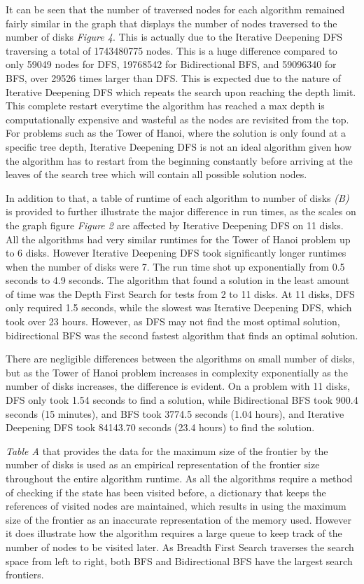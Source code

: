 \documentclass[conference]{IEEEtran}
\begin{document}
It can be seen that the number of traversed nodes for each algorithm remained fairly similar in the graph that displays the number of nodes traversed to the number of disks \textit{Figure 4}. This is actually due to the Iterative Deepening DFS traversing a total of 1743480775 nodes. This is a huge difference compared to only 59049 nodes for DFS, 19768542 for Bidirectional BFS, and 59096340 for BFS, over 29526 times larger than DFS. This is expected due to the nature of Iterative Deepening DFS which repeats the search upon reaching the depth limit. This complete restart everytime the algorithm has reached a max depth is computationally expensive and wasteful as the nodes are revisited from the top. For problems such as the Tower of Hanoi, where the solution is only found at a specific tree depth, Iterative Deepening DFS is not an ideal algorithm given how the algorithm has to restart from the beginning constantly before arriving at the leaves of the search tree which will contain all possible solution nodes. 

In addition to that, a table of runtime of each algorithm to number of disks \textit{(B)} is provided to further illustrate the major difference in run times, as the scales on the graph figure \textit{Figure 2} are affected by Iterative Deepening DFS on 11 disks. All the algorithms had very similar runtimes for the Tower of Hanoi problem up to 6 disks. However Iterative Deepening DFS took significantly longer runtimes when the number of disks were 7. The run time shot up exponentially from 0.5 seconds to 4.9 seconds. The algorithm that found a solution in the least amount of time was the Depth First Search for tests from 2 to 11 disks. At 11 disks, DFS only required 1.5 seconds, while the slowest was Iterative Deepening DFS, which took over 23 hours. However, as DFS may not find the most optimal solution, bidirectional BFS was the second fastest algorithm that finds an optimal solution.

There are negligible differences between the algorithms on small number of disks, but as the Tower of Hanoi problem increases in complexity exponentially as the number of disks increases, the difference is evident. On a problem with 11 disks, DFS only took 1.54 seconds to find a solution, while Bidirectional BFS took 900.4 seconds (15 minutes), and BFS took 3774.5 seconds (1.04 hours), and Iterative Deepening DFS took 84143.70 seconds (23.4 hours) to find the solution. 

\textit{Table A} that provides the data for the maximum size of the frontier by the number of disks is used as an empirical representation of the frontier size throughout the entire algorithm runtime. As all the algorithms require a method of checking if the state has been visited before, a dictionary that keeps the references of visited nodes are maintained, which results in using the maximum size of the frontier as an inaccurate representation of the memory used. However it does illustrate how the algorithm requires a large queue to keep track of the number of nodes to be visited later. As Breadth First Search traverses the search space from left to right, both BFS and Bidirectional BFS have the largest search frontiers.   
\end{document}
